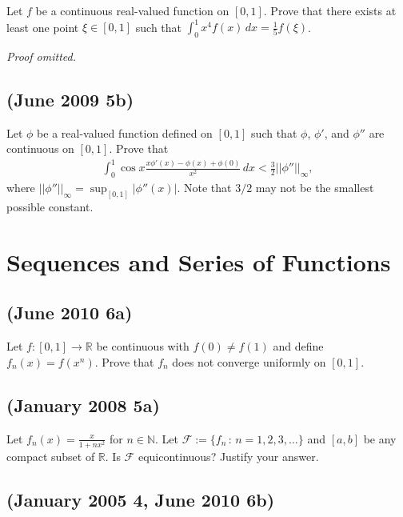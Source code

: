 Let \(f\) be a continuous real-valued function on \([0,1]\). Prove that
there exists at least one point \(\xi\in[0,1]\) such that
\(\int_0^1 x^4 f(x)\,dx=\frac{1}{5}f(\xi)\).

\emph{Proof omitted.}

\hypertarget{june-2009-5b}{%
\subsection{(June 2009 5b)}\label{june-2009-5b}}

Let \(\phi\) be a real-valued function defined on \([0,1]\) such that
\(\phi\), \(\phi'\), and \(\phi''\) are continuous on \([0,1]\). Prove
that
\begin{align*}\int_0^1 \cos x \frac{x\phi'(x)-\phi(x)+\phi(0)}{x^2}\,dx<\frac{3}{2}||\phi''||_\infty,\end{align*}
where \(||\phi''||_\infty = \sup_{[0,1]}|\phi''(x)|.\) Note that \(3/2\)
may not be the smallest possible constant.

\hypertarget{sequences-and-series-of-functions}{%
\section{Sequences and Series of
Functions}\label{sequences-and-series-of-functions}}

\hypertarget{june-2010-6a}{%
\subsection{(June 2010 6a)}\label{june-2010-6a}}

Let \(f:[0,1]\to\mathbb{R}\) be continuous with \(f(0)\neq f(1)\) and
define \(f_n(x)=f(x^n)\). Prove that \(f_n\) does not converge uniformly
on \([0,1]\).

\hypertarget{january-2008-5a}{%
\subsection{(January 2008 5a)}\label{january-2008-5a}}

Let \(f_n(x) = \frac{x}{1+nx^2}\) for \(n \in \mathbb{N}\). Let
\(\mathcal{F} := \{f_n \, \colon \, n = 1, 2, 3, \ldots\}\) and
\([a,b]\) be any compact subset of \(\mathbb{R}\). Is \(\mathcal{F}\)
equicontinuous? Justify your answer.

\hypertarget{january-2005-4-june-2010-6b}{%
\subsection{(January 2005 4, June 2010
6b)}\label{january-2005-4-june-2010-6b}}

